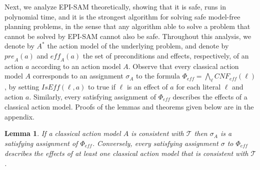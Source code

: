 \documentclass[letterpaper]{article} %
\newcommand{\tuple}[1]{\ensuremath{\left \langle #1 \right \rangle }}
\newcommand{\pre}{\textit{pre}}
\newcommand{\eff}{\textit{eff}}
\newcommand{\cnf}{\textit{CNF}}
\newcommand{\true}{\textit{true}}
\newcommand{\iseff}{\textit{IsEff}}
\newcommand{\ispre}{\textit{IsPre}}
\newcommand{\state}{\textit{State}}
\newtheorem{lemma}{Lemma}
\begin{document}
Next, we analyze EPI-SAM theoretically, showing that it is safe, runs in polynomial time, and it is the strongest algorithm for solving safe model-free planning problems, in the sense that any algorithm able to solve a problem that cannot be solved by EPI-SAM cannot also be safe. 
Throughout this analysis, we denote by $A^*$ the action model of the underlying problem, and denote by $\pre_A(a)$ and $\eff_A(a)$ the set of preconditions and effects, respectively, of an action $a$ according to an action model $A$. 
Observe that every classical action model $A$ corresponds to an assignment $\sigma_A$ to the formula $\Phi_\eff=\bigwedge_\ell \cnf_\eff(\ell)$, by setting $\iseff(\ell,a)$ to true if $\ell$ is an effect of $a$ for each literal $\ell$ and action $a$. 
Similarly, every satisfying assignment of $\Phi_\eff$ describes the effects of a classical action model. 
Proofs of the lemmas and theorems given below are in the appendix. 
\begin{lemma}\label{lem:cnf-char}
If a classical action model $A$ is consistent with $\mathcal{T}$
then $\sigma_A$ is a satisfying assignment of $\Phi_\eff$. 
Conversely, every satisfying assignment $\sigma$ to $\Phi_\eff$ describes the effects of at least one classical action model that is consistent with $\mathcal{T}$. 
\end{lemma}
\end{document}
